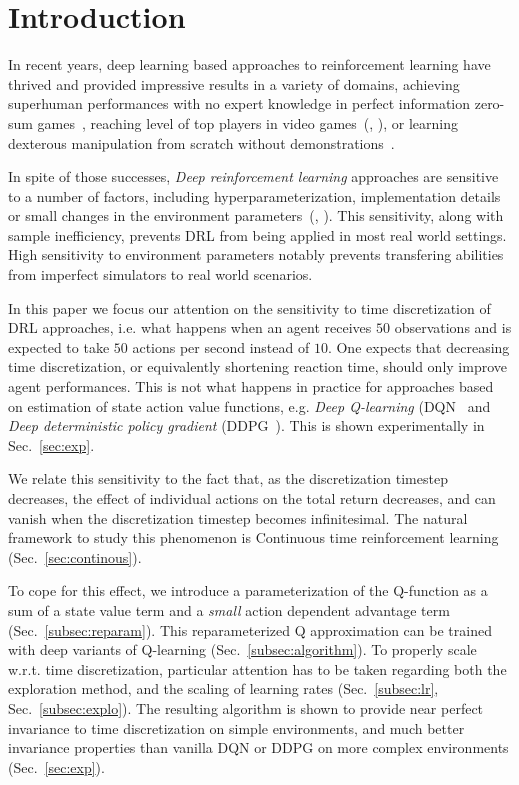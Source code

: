 
\section{Introduction}
\label{sec:intro}
In recent years, deep learning based approaches to reinforcement learning have
thrived and provided impressive results in a variety of domains, achieving superhuman
performances with no expert knowledge in perfect information zero-sum
games~\cite{alphazero}, reaching level of top players in video
games~(\citealt{openai_five}, \citealt{dqn}), or learning dexterous manipulation
from scratch without demonstrations~\cite{hand_control}.

In spite of those successes, \emph{Deep reinforcement learning} approaches are
sensitive to a number of factors, including hyperparameterization,
implementation details or small changes in the environment
parameters~(\citealt{drl_matter}, \citealt{drl_matter_bis}). This sensitivity,
along with sample inefficiency, prevents DRL from being applied in most real
world settings. High sensitivity to environment parameters notably prevents
transfering abilities from imperfect simulators to real world scenarios.

In this paper we focus our attention on the sensitivity to time discretization
of DRL approaches, i.e. what happens when an agent receives $50$ observations
and is expected to take $50$ actions per second instead of $10$. One expects
that decreasing time discretization, or equivalently shortening reaction time,
should only improve agent performances. This is not what happens in practice
for approaches based on estimation of state action value functions, e.g.
\emph{Deep Q-learning} (DQN~\citep{dqn} and \emph{Deep deterministic policy
gradient} (DDPG~\citep{ddpg}). This is shown experimentally in Sec.~\ref{sec:exp}.

We relate this sensitivity to the fact that, as the discretization timestep
decreases, the effect of individual actions on the total return decreases, and
can vanish when the discretization timestep becomes infinitesimal. The natural
framework to study this phenomenon is Continuous time reinforcement learning 
(Sec.~\ref{sec:continous}). 

To cope for this effect, we introduce a
parameterization of the Q-function as a sum of a state value term and a
\emph{small} action dependent advantage term (Sec.~\ref{subsec:reparam}). This
reparameterized Q approximation can be trained with deep variants of Q-learning
(Sec.~\ref{subsec:algorithm}).  To properly scale w.r.t. time discretization,
particular attention has to be taken regarding both the exploration method, and
the scaling of learning rates (Sec.~\ref{subsec:lr}, Sec.~\ref{subsec:explo}).
The resulting algorithm is shown to provide near perfect invariance to time
discretization on simple environments, and much better invariance properties
than vanilla DQN or DDPG on more complex environments (Sec.~\ref{sec:exp}).

